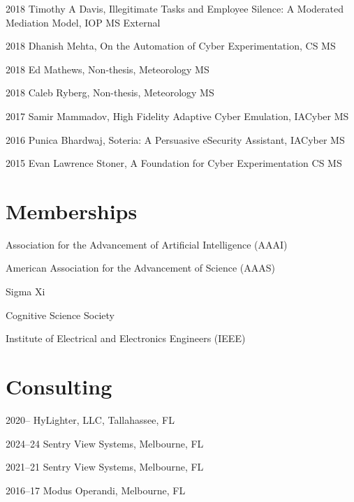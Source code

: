 \documentclass[12pt,letterpaper]{report}
\newcommand{\listitemspace}{0.25em}
\renewenvironment{itemize}
{\begin{list}{}{\setlength{\leftmargin}{0em}
                \setlength{\parskip}{0em}
                \setlength{\itemsep}{\listitemspace}
                \setlength{\parsep}{\listitemspace}}}
{\end{list}}
\begin{document}
\begin{itemize}
    \item 2018 Timothy A Davis, Illegitimate Tasks and Employee Silence: A Moderated Mediation Model, IOP MS External
    \item 2018 Dhanish Mehta, On the Automation of Cyber Experimentation, CS MS
    \item 2018 Ed Mathews, Non-thesis, Meteorology MS
    \item 2018 Caleb Ryberg, Non-thesis, Meteorology MS
    \item 2017 Samir Mammadov, High Fidelity Adaptive Cyber Emulation, IACyber MS
    \item 2016 Punica Bhardwaj, Soteria: A Persuasive eSecurity Assistant, IACyber MS
    \item 2015 Evan Lawrence Stoner, A Foundation for Cyber Experimentation CS MS

    \end{itemize}

    \section*{Memberships}

    \begin{itemize}

        \item Association for the Advancement of Artificial Intelligence (AAAI)
        \item American Association for the Advancement of Science (AAAS)
        \item Sigma Xi
        \item Cognitive Science Society
        \item Institute of Electrical and Electronics Engineers (IEEE)
    \end{itemize}



    \section*{Consulting}

    \begin{tablist}
        \item[2020--  ] \tab{}HyLighter, LLC, Tallahassee, FL
        \item[2024--24] \tab{}Sentry View Systems, Melbourne, FL
        \item[2021--21] \tab{}Sentry View Systems, Melbourne, FL
        \item[2016--17] \tab{}Modus Operandi, Melbourne, FL
    \end{tablist}
\end{document}
